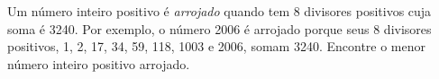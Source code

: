 Um  número  inteiro  positivo  é \textit{arrojado} quando  tem  8  divisores  positivos  cuja  soma  é  3240.  Por  exemplo,  o  número  2006  é  arrojado  porque  seus  8  divisores  positivos,  1,  2,  17,  34,  59,  118,  1003  e  2006,  somam  3240.  Encontre  o  menor  número inteiro positivo arrojado.